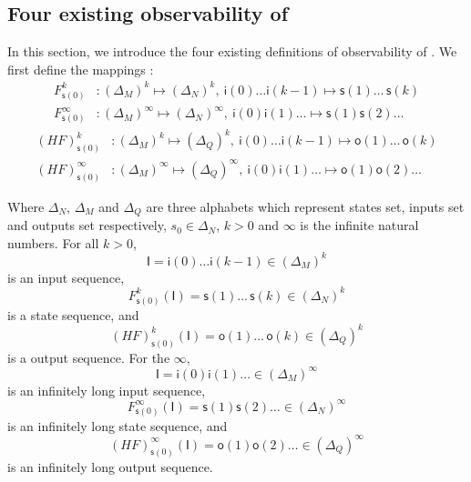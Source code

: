 \subsection{Four existing observability of \BCNs}
In this section, we introduce the four existing definitions of observability of \BCNs. %
We first define the mappings \cite{Zhang2016Observability}:
\begin{equation}
\begin{split}
F^k_{\mathsf{s}(0)} &: (\Delta_M)^k\mapsto(\Delta_N)^k,\ \mathsf{i}(0)\ldots \mathsf{i}({k-1}) \mapsto \mathsf{s}(1) \ldots\, \mathsf{s}(k)\\
F^{\infty}_{\mathsf{s}(0)} &: (\Delta_M)^{\infty}\mapsto(\Delta_N)^{\infty},\ \mathsf{i}(0) \mathsf{i}(1) \ldots  \mapsto \mathsf{s}(1) \mathsf{s}(2) \ldots
\end{split}
\label{equ:5}
\end{equation}
\begin{equation}
\begin{split}
(HF)^k_{\mathsf{s}(0)} &: (\Delta_M)^k\mapsto(\Delta_Q)^k,\ \mathsf{i}(0)\ldots \mathsf{i}(k-1) \mapsto \mathsf{o}(1)\ldots\, \mathsf{o}(k)\\
(HF)^{\infty}_{\mathsf{s}(0)} &: (\Delta_M)^{\infty}\mapsto(\Delta_Q)^{\infty},\ \mathsf{i}(0) \mathsf{i}(1) \ldots  \mapsto \mathsf{o}(1) \mathsf{o}(2)\ldots
\end{split}
\label{equ:6}
\end{equation}

Where $\Delta_N$, $\Delta_M$ and $\Delta_Q$ are three alphabets which represent states set, inputs set and outputs set respectively, $s_0\in \Delta_N$, $k>0$ and $\infty$ is the infinite natural numbers. For all  $k>0$,%
\[\mathsf{I}=\mathsf{i}(0)\ldots \mathsf{i}({k-1}) \in(\Delta_M)^k\] 
is an input sequence, 
\[F^k_{\mathsf{s}(0)}(\mathsf{I})=\mathsf{s}(1) \ldots\, \mathsf{s}(k) \in(\Delta_N)^k\]
 is a state sequence, and 
 \[(HF)^k_{\mathsf{s}(0)}(\mathsf{I})=\mathsf{o}(1)\ldots\, \mathsf{o}(k) \in(\Delta_Q)^k\] 
 is a output sequence. For the $\infty$, 
 \[\mathsf{I}=\mathsf{i}(0) \mathsf{i}(1)\ldots  \in(\Delta_M)^{\infty}\] 
 is an infinitely long input sequence, 
 \[F^{\infty}_{\mathsf{s}(0)}(\mathsf{I})=\mathsf{s}(1) \mathsf{s}(2)\ldots  \in(\Delta_N)^{\infty}\] 
 is an infinitely long state sequence, and 
 \[(HF)^{\infty}_{\mathsf{s}(0)}(\mathsf{I})=\mathsf{o}(1) \mathsf{o}(2)\ldots \in(\Delta_Q)^{\infty}\]
  is an infinitely long output sequence. 
  
